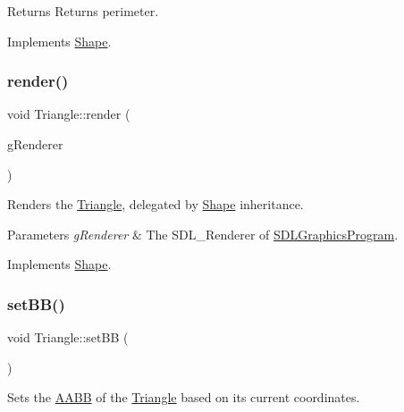 \begin{DoxyReturn}{Returns}
Returns perimeter. 
\end{DoxyReturn}


Implements \mbox{\hyperlink{class_shape_a3918812ff3a143dabbeba2f650fb5e7c}{Shape}}.

\mbox{\label{class_triangle_a46ec1698397a34b08cd788e305dda75c}} 
\subsubsection{\texorpdfstring{render()}{render()}}
{\footnotesize\ttfamily void Triangle\+::render (\begin{DoxyParamCaption}\item[{S\+D\+L\+\_\+\+Renderer $\ast$}]{g\+Renderer }\end{DoxyParamCaption})\hspace{0.3cm}{\ttfamily [virtual]}}



Renders the \mbox{\hyperlink{class_triangle}{Triangle}}, delegated by \mbox{\hyperlink{class_shape}{Shape}} inheritance. 


\begin{DoxyParams}{Parameters}
{\em g\+Renderer} & The S\+D\+L\+\_\+\+Renderer of \mbox{\hyperlink{class_s_d_l_graphics_program}{S\+D\+L\+Graphics\+Program}}. \\
\hline
\end{DoxyParams}


Implements \mbox{\hyperlink{class_shape_a07881321ba401e7cdbd83b4f2b009e37}{Shape}}.

\mbox{\label{class_triangle_a857d761fa1f0b53b355d46be53a4796e}} 
\subsubsection{\texorpdfstring{setBB()}{setBB()}}
{\footnotesize\ttfamily void Triangle\+::set\+BB (\begin{DoxyParamCaption}{ }\end{DoxyParamCaption})\hspace{0.3cm}{\ttfamily [virtual]}}



Sets the \mbox{\hyperlink{class_a_a_b_b}{A\+A\+BB}} of the \mbox{\hyperlink{class_triangle}{Triangle}} based on its current coordinates. 



